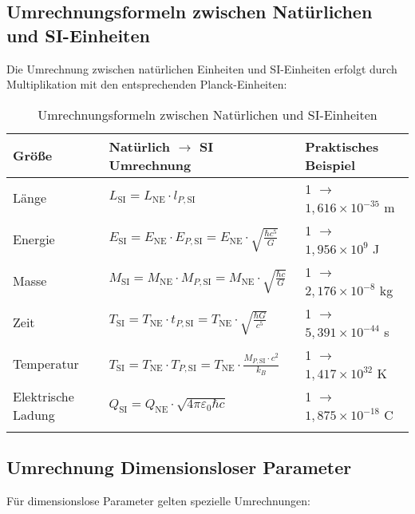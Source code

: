 \documentclass[12pt,a4paper]{article}
\begin{document}
	\subsection{Umrechnungsformeln zwischen Natürlichen und SI-Einheiten}
	
	Die Umrechnung zwischen natürlichen Einheiten und SI-Einheiten erfolgt durch Multiplikation mit den entsprechenden Planck-Einheiten:
	
	\begin{table}[ht]
		\centering
		\begin{adjustbox}{scale=1}
			\begin{tabular}{lll}
				\hline
				\textbf{Größe} & \textbf{Natürlich $\to$ SI Umrechnung} & \textbf{Praktisches Beispiel} \\
				\hline
				Länge & $L_{\text{SI}} = L_{\text{NE}} \cdot l_{P,\text{SI}}$ & 1 $\to$ $1,616 \times 10^{-35}$ m \\
				Energie & $E_{\text{SI}} = E_{\text{NE}} \cdot E_{P,\text{SI}} = E_{\text{NE}} \cdot \sqrt{\frac{\hbar c^5}{G}}$ & 1 $\to$ $1,956 \times 10^9$ J \\
				Masse & $M_{\text{SI}} = M_{\text{NE}} \cdot M_{P,\text{SI}} = M_{\text{NE}} \cdot \sqrt{\frac{\hbar c}{G}}$ & 1 $\to$ $2,176 \times 10^{-8}$ kg \\
				Zeit & $T_{\text{SI}} = T_{\text{NE}} \cdot t_{P,\text{SI}} = T_{\text{NE}} \cdot \sqrt{\frac{\hbar G}{c^5}}$ & 1 $\to$ $5,391 \times 10^{-44}$ s \\
				Temperatur & $T_{\text{SI}} = T_{\text{NE}} \cdot T_{P,\text{SI}} = T_{\text{NE}} \cdot \frac{M_{P,\text{SI}}\cdot c^2}{k_B}$ & 1 $\to$ $1,417 \times 10^{32}$ K \\
				Elektrische Ladung & $Q_{\text{SI}} = Q_{\text{NE}} \cdot \sqrt{4\pi\varepsilon_0\hbar c}$ & 1 $\to$ $1,875 \times 10^{-18}$ C \\
				\hline
				 \multicolumn{2}{c}{} \\
				\hline
			\end{tabular}
		\end{adjustbox}
		\caption{Umrechnungsformeln zwischen Natürlichen und SI-Einheiten }
		\label{tab:conversion}
	\end{table}
	
	\subsection{Umrechnung Dimensionsloser Parameter}
	
	Für dimensionslose Parameter gelten spezielle Umrechnungen:
	
\end{document}
